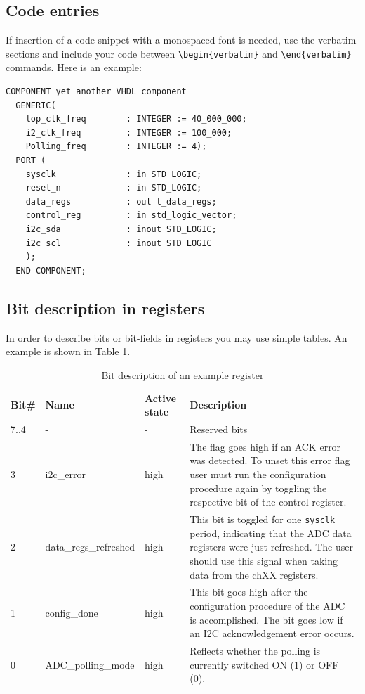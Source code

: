 \documentclass[a4paper, 10pt, onecolumn]{article}
\def\widehline{%
\noalign{\global\dimen1 \arrayrulewidth
\global\arrayrulewidth3\arrayrulewidth}%
\hline
\noalign{\global\arrayrulewidth\dimen1 }}
\newcommand{\chline}{%
    \arrayrulecolor{burgund}\widehline\arrayrulecolor{gray25}
}
\begin{document}
\subsection*{Code entries}
If insertion of a code snippet with a monospaced font is needed, use the verbatim sections and include your code between \verb+\begin{verbatim}+ and \verb+\end{verbatim}+ commands. 
Here is an example:
\begin{verbatim}
COMPONENT yet_another_VHDL_component
  GENERIC(
    top_clk_freq        : INTEGER := 40_000_000; 
    i2_clk_freq         : INTEGER := 100_000;      
    Polling_freq        : INTEGER := 4);
  PORT (
    sysclk              : in STD_LOGIC;
    reset_n             : in STD_LOGIC;
    data_regs           : out t_data_regs;
    control_reg         : in std_logic_vector;
    i2c_sda             : inout STD_LOGIC;  
    i2c_scl             : inout STD_LOGIC   
    );
  END COMPONENT;
\end{verbatim}

\subsection*{Bit description in registers}
In order to describe bits or bit-fields in registers you may use simple tables. 
An example is shown in Table \ref{tab:examplereg}.

\begin{table}[H]
\caption{Bit description of an example register}
\label{tab:examplereg}
\centering\bgroup
\def\arraystretch{1.5}
\begin{tabularx}{\textwidth}{|l|l|l|X|}
    \hline
    \textbf{Bit\#} & \textbf{Name} & \textbf{Active state} & \textbf{Description} \\ \chline
    7..4 & - & - & Reserved bits\\ \hline
    3 & i2c\_error & high & The flag goes high if an ACK error was detected. To unset this error flag user must run the configuration procedure again by toggling the respective bit of the control register.\\ \hline
    2 & data\_regs\_refreshed & high & This bit is toggled for one \verb|sysclk| period, indicating that the ADC data registers were just refreshed. The user should use this signal when taking data from the chXX registers. \\ \hline
    1 & config\_done & high & This bit goes high after the configuration procedure of the ADC is accomplished. The bit goes low if an I2C acknowledgement error occurs. \\ \hline
    0 & ADC\_polling\_mode & high & Reflects whether the polling is currently switched ON (1) or OFF (0).\\ \hline
\end{tabularx}
\egroup
\end{table}
\end{document}
